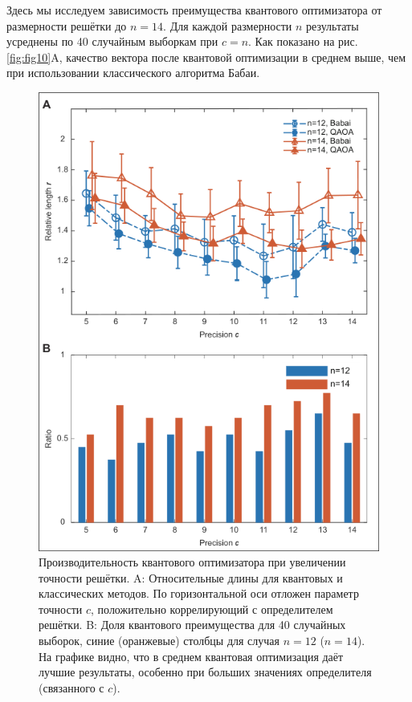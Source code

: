 Здесь мы исследуем зависимость преимущества квантового оптимизатора от
размерности решётки до $n = 14$. Для каждой размерности $n$ результаты
усреднены по 40 случайным выборкам при $c = n$. Как показано на рис.
\ref{fig:fig10}A, качество вектора после квантовой оптимизации в среднем выше,
чем при использовании классического алгоритма Бабаи.
\begin{figure}
    \centering
    \includegraphics[scale=0.6]{inc/fig_09.png}
    \caption{
    Производительность квантового оптимизатора при увеличении точности решётки.
    A: Относительные длины для квантовых и классических методов. По
    горизонтальной оси отложен параметр точности $c$, положительно
    коррелирующий с определителем решётки. B: Доля квантового преимущества для
    40 случайных выборок, синие (оранжевые) столбцы для случая $n = 12$ ($n =
    14$). На графике видно, что в среднем квантовая оптимизация даёт лучшие
    результаты, особенно при больших значениях определителя (связанного с $c$).
    }
    \label{fig:fig09}
\end{figure}

